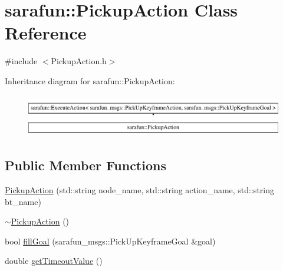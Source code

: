 \hypertarget{classsarafun_1_1PickupAction}{\section{sarafun\-:\-:Pickup\-Action Class Reference}
\label{classsarafun_1_1PickupAction}
}


{\ttfamily \#include $<$Pickup\-Action.\-h$>$}

Inheritance diagram for sarafun\-:\-:Pickup\-Action\-:\begin{figure}[H]
\begin{center}
\leavevmode
\includegraphics[height=1.869783cm]{classsarafun_1_1PickupAction}
\end{center}
\end{figure}
\subsection*{Public Member Functions}
\begin{DoxyCompactItemize}
\item 
\hyperlink{classsarafun_1_1PickupAction_a1663ebd551413acbc5f21e86a0e3b8cc}{Pickup\-Action} (std\-::string node\-\_\-name, std\-::string action\-\_\-name, std\-::string bt\-\_\-name)
\item 
\hyperlink{classsarafun_1_1PickupAction_acadfc84a0339caa9cc02c5d599e6aaeb}{$\sim$\-Pickup\-Action} ()
\item 
bool \hyperlink{classsarafun_1_1PickupAction_a4aa9956733de9f12b52aa41038dbe87a}{fill\-Goal} (sarafun\-\_\-msgs\-::\-Pick\-Up\-Keyframe\-Goal \&goal)
\item 
double \hyperlink{classsarafun_1_1PickupAction_a02643cdc836095102e5622b660233f26}{get\-Timeout\-Value} ()
\end{DoxyCompactItemize}



